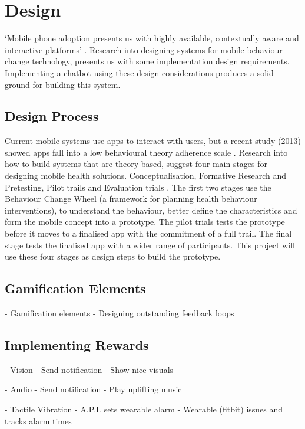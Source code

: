 
\newpage
\section{Design}
`Mobile phone adoption presents us with highly available, contextually aware and interactive platforms' \cite{article_mhealth}. Research into designing systems for mobile behaviour change technology, presents us with some implementation design requirements. Implementing a chatbot using these design considerations produces a solid ground for building this system.

\subsection*{Design Process}
Current mobile systems use apps to interact with users, but a recent study (2013) showed apps fall into a low behavioural theory adherence scale \cite{article_mhealth}. Research into how to build systems that are theory-based, suggest four main stages for designing mobile health solutions. Conceptualisation, Formative Research and Pretesting, Pilot trails and Evaluation trials \cite{article_mhealth}. The first two stages use the Behaviour Change Wheel \cite{article_behaviour_change_wheel} (a framework for planning health behaviour interventions), to understand the behaviour, better define the characteristics and form the mobile concept into a prototype. The pilot trials tests the prototype before it moves to a finalised app with the commitment of a full trail. The final stage tests the finalised app with a wider range of participants. This project will use these four stages as design steps to build the prototype.

\subsection*{Gamification Elements}
- Gamification elements \cite{article_free_to_play_making_money_from_games_you_give_away}
- Designing outstanding feedback loops \cite{website_how_to_design_feedback_loops}


\subsection{Implementing Rewards}
- Vision
  - Send notification
  - Show nice visuals

- Audio
  - Send notification
  - Play uplifting music

- Tactile Vibration
  - A.P.I. sets wearable alarm
  - Wearable (fitbit) issues and tracks alarm times

